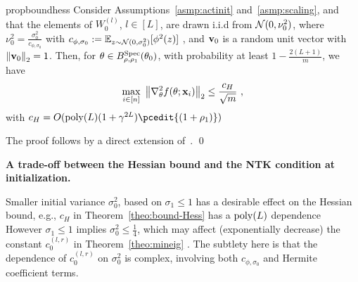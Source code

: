 \begin{restatable}{prop}{boundhess}
\label{theo:bound-Hess}
Consider Assumptions~\ref{asmp:actinit} and~\ref{asmp:scaling}, and that the elements of $W_0^{(l)}$, $l\in[L]$, are drawn i.i.d from ${\cal N}(0,\nu_0^2)$, where $\nu_0^2 = \frac{\sigma_0^2}{c_{\phi,\sigma_0}}$ with $c_{\phi,\sigma_0} := \mathbb{E}_{z \sim {\cal N}(0,\sigma_0^2)}[\phi^2(z)]$ , and $\mathbf{v}_0$ is a random unit vector with $\left\lVert\mathbf{v}_0\right\rVert_2=1$. Then, for $\theta \in B_{\rho,\rho_1}^{\operatorname{Spec}}(\theta_0)$, 
with probability at least $1-\frac{2(L+1)}{m}$, we have 
\begin{equation}
\label{eq:bound_Hessian}
   \max_{i \in [n]} ~\left\lVert \nabla^2_\theta f(\theta;\mathbf{x}_i)\right\rVert_2 \leq \frac{c_H}{\sqrt{m}}~,
\end{equation}
with $c_H = O(\poly(L)(1+\gamma^{2L})\pcedit{(1+\rho_1)})$ 
\end{restatable}
%
\proof The proof follows by a direct extension of~\citep[Theorem~4.1]{AB-PCV-LZ-MB:22}.   %
\qed 

{\par \textbf{A trade-off between the Hessian bound and the NTK condition at initialization.}}
Smaller initial variance $\sigma_0^2$, based on $\sigma_1 \leq 1$ has a desirable effect on the Hessian bound, e.g., $c_H$ in Theorem~\ref{theo:bound-Hess} has a $\operatorname{poly}(L)$ dependence  However $\sigma_1 \leq 1$ implies $\sigma_0^2 \leq \frac{1}{4}$, which may affect (exponentially decrease) the constant $c_0^{(l,r)}$ in Theorem~\ref{theo:mineig} . The subtlety here is that the dependence of $c_0^{(l,r)}$ on $\sigma_0^2$ is complex, involving both $c_{\phi,\sigma_0}$ and Hermite coefficient terms.  %

